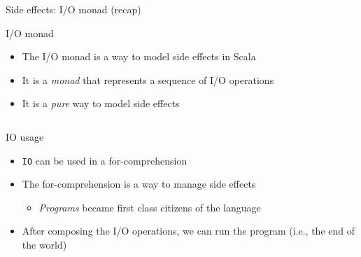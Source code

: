 \documentclass[presentation, 10pt]{beamer}\mode<presentation>{\usetheme{metropolis}}
\begin{document}
\begin{frame}[fragile]{Side effects: I/O monad (recap)}
\begin{exampleblock}{I/O monad}
	\begin{itemize}
		\item The I/O monad is a way to model side effects in Scala
		\item It is a \emph{monad} that represents a sequence of I/O operations
		\item It is a \emph{pure} way to model side effects
	\end{itemize}
\end{exampleblock}
\inputminted[firstline=6,lastline=17]{scala}{code/src/main/scala/monads/IO.scala}
\end{frame}

\begin{frame}{IO usage}
\begin{itemize}
	\item \texttt{IO} can be used in a for-comprehension
	\item The for-comprehension is a way to manage side effects
	\begin{itemize}
		\item \emph{Programs} became first class citizens of the language
	\end{itemize}
	\item After composing the I/O operations, we can run the program (i.e., the end of the world)
\end{itemize}
\inputminted[firstline=42,lastline=48]{scala}{code/src/main/scala/monads/IO.scala}
\end{frame}
\end{document}
